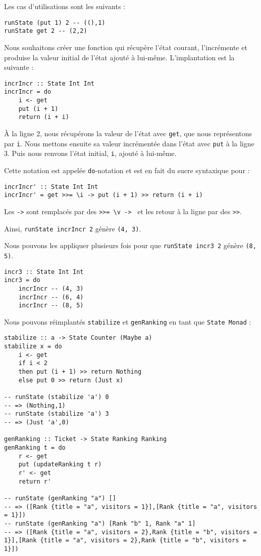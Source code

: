 \documentclass{llncs}
\begin{document}
Les cas d'utilisations sont les suivants :
\begin{lstlisting}
runState (put 1) 2 -- ((),1)
runState get 2 -- (2,2)
\end{lstlisting}

Nous souhaitons créer une fonction qui récupère l'état courant,
l'incrémente et produise la valeur initial de l'état ajouté à lui-même.
L'implantation est la suivante :
\begin{lstlisting}
incrIncr :: State Int Int
incrIncr = do
    i <- get
    put (i + 1)
    return (i + i)
\end{lstlisting}
À la ligne 2, nous récupérons la valeur de l'état avec \lstinline{get}, que nous
représentons par \lstinline{i}.
Nous mettons ensuite sa valeur incrémentée dans l'état avec \lstinline{put} à la
ligne 3.
Puis nous renvons l'état initial, \lstinline{i}, ajouté à lui-même.

Cette notation est appelée \lstinline{do}-notation et est en fait du sucre syntaxique
pour :
\begin{lstlisting}
incrIncr' :: State Int Int
incrIncr' = get >>= \i -> put (i + 1) >> return (i + i)
\end{lstlisting}
Les \lstinline{->} sont remplacés par des \lstinline{>>= \v -> } et les retour à
la ligne par des \lstinline{>>}.

Ainsi, \lstinline{runState incrIncr 2} génère \lstinline{(4, 3)}.

Nous pouvons les appliquer plusieurs fois pour que \lstinline{runState incr3 2} génère \lstinline{(8, 5)}.
\begin{lstlisting}
incr3 :: State Int Int
incr3 = do
    incrIncr -- (4, 3)
    incrIncr -- (6, 4)
    incrIncr -- (8, 5)
\end{lstlisting}

Nous pouvons réimplantés \lstinline{stabilize} et \lstinline{genRanking} en tant
que \lstinline{State Monad} :
\begin{lstlisting}
stabilize :: a -> State Counter (Maybe a)
stabilize x = do
    i <- get
    if i < 2
    then put (i + 1) >> return Nothing
    else put 0 >> return (Just x)

-- runState (stabilize 'a') 0
-- => (Nothing,1)
-- runState (stabilize 'a') 3
-- => (Just 'a',0)

genRanking :: Ticket -> State Ranking Ranking
genRanking t = do
    r <- get
    put (updateRanking t r)
    r' <- get
    return r'

-- runState (genRanking "a") []
-- => ([Rank {title = "a", visitors = 1}],[Rank {title = "a", visitors = 1}])
-- runState (genRanking "a") [Rank "b" 1, Rank "a" 1] 
-- => ([Rank {title = "a", visitors = 2},Rank {title = "b", visitors = 1}],[Rank {title = "a", visitors = 2},Rank {title = "b", visitors = 1}])
\end{lstlisting}
\end{document}
